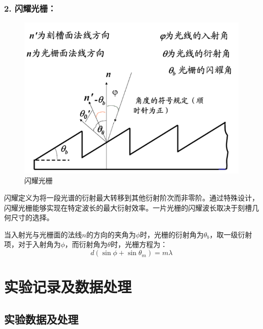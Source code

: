 \documentclass[utf8]{ctexart}
\begin{document}
	\subsubsection*{2. 闪耀光栅：}
	\begin{figure}
		\centering
		\includegraphics[scale=0.6]{Graph1.png}
		\caption{闪耀光栅}
	\end{figure}
	闪耀定义为将一段光谱的衍射最大转移到其他衍射阶次而非零阶。通过特殊设计，闪耀光栅能够实现在特定波长的最大衍射效率。一片光栅的闪耀波长取决于刻槽几何尺寸的选择。

	当入射光与光栅面的法线$n$的方向的夹角为$\phi$时，光栅的衍射角为$\theta_b$，取一级衍射项，对于入射角为$\phi$，而衍射角为$\theta$时，光栅方程为：
	\begin{equation}
		d(\sin{\phi}+\sin{\theta_m})=m\lambda
	\end{equation}
	
	\section*{实验记录及数据处理}
	\subsection*{实验数据及处理}
\end{document}
